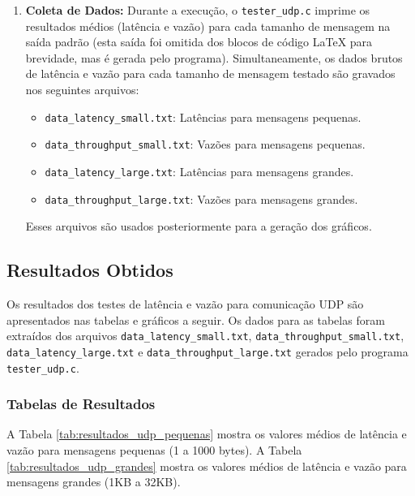 \begin{enumerate}
    \item \textbf{Coleta de Dados:}
    Durante a execução, o \texttt{tester\_udp.c} imprime os resultados médios (latência e vazão) para cada tamanho de mensagem na saída padrão (esta saída foi omitida dos blocos de código LaTeX para brevidade, mas é gerada pelo programa). Simultaneamente, os dados brutos de latência e vazão para cada tamanho de mensagem testado são gravados nos seguintes arquivos:
    \begin{itemize}
        \item \texttt{data\_latency\_small.txt}: Latências para mensagens pequenas.
        \item \texttt{data\_throughput\_small.txt}: Vazões para mensagens pequenas.
        \item \texttt{data\_latency\_large.txt}: Latências para mensagens grandes.
        \item \texttt{data\_throughput\_large.txt}: Vazões para mensagens grandes.
    \end{itemize}
    Esses arquivos são usados posteriormente para a geração dos gráficos.
\end{enumerate}

\subsection{Resultados Obtidos}
\label{subsec:resultados_exp2}
Os resultados dos testes de latência e vazão para comunicação UDP são apresentados nas tabelas e gráficos a seguir. Os dados para as tabelas foram extraídos dos arquivos \texttt{data\_latency\_small.txt}, \texttt{data\_throughput\_small.txt}, \texttt{data\_latency\_large.txt} e \texttt{data\_throughput\_large.txt} gerados pelo programa \texttt{tester\_udp.c}.

\subsubsection{Tabelas de Resultados}

A Tabela \ref{tab:resultados_udp_pequenas} mostra os valores médios de latência e vazão para mensagens pequenas (1 a 1000 bytes).
A Tabela \ref{tab:resultados_udp_grandes} mostra os valores médios de latência e vazão para mensagens grandes (1KB a 32KB).

